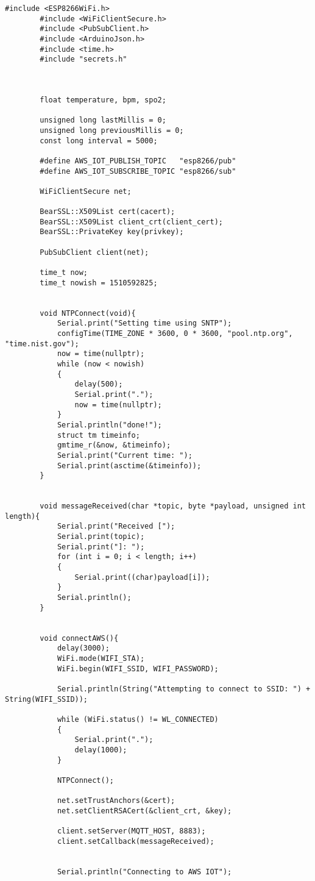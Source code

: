 \begin{flushleft}
	\begin{lstlisting}[style=CStyle]
		#include <ESP8266WiFi.h>
		#include <WiFiClientSecure.h>
		#include <PubSubClient.h>
		#include <ArduinoJson.h>
		#include <time.h>
		#include "secrets.h"
		
		
		
		float temperature, bpm, spo2;
		
		unsigned long lastMillis = 0;
		unsigned long previousMillis = 0;
		const long interval = 5000;
		
		#define AWS_IOT_PUBLISH_TOPIC   "esp8266/pub"
		#define AWS_IOT_SUBSCRIBE_TOPIC "esp8266/sub"
		
		WiFiClientSecure net;
		
		BearSSL::X509List cert(cacert);
		BearSSL::X509List client_crt(client_cert);
		BearSSL::PrivateKey key(privkey);
		
		PubSubClient client(net);
		
		time_t now;
		time_t nowish = 1510592825;
		
		
		void NTPConnect(void){
			Serial.print("Setting time using SNTP");
			configTime(TIME_ZONE * 3600, 0 * 3600, "pool.ntp.org", "time.nist.gov");
			now = time(nullptr);
			while (now < nowish)
			{
				delay(500);
				Serial.print(".");
				now = time(nullptr);
			}
			Serial.println("done!");
			struct tm timeinfo;
			gmtime_r(&now, &timeinfo);
			Serial.print("Current time: ");
			Serial.print(asctime(&timeinfo));
		}
		
		
		void messageReceived(char *topic, byte *payload, unsigned int length){
			Serial.print("Received [");
			Serial.print(topic);
			Serial.print("]: ");
			for (int i = 0; i < length; i++)
			{
				Serial.print((char)payload[i]);
			}
			Serial.println();
		}
		
		
		void connectAWS(){
			delay(3000);
			WiFi.mode(WIFI_STA);
			WiFi.begin(WIFI_SSID, WIFI_PASSWORD);
			
			Serial.println(String("Attempting to connect to SSID: ") + String(WIFI_SSID));
			
			while (WiFi.status() != WL_CONNECTED)
			{
				Serial.print(".");
				delay(1000);
			}
			
			NTPConnect();
			
			net.setTrustAnchors(&cert);
			net.setClientRSACert(&client_crt, &key);
			
			client.setServer(MQTT_HOST, 8883);
			client.setCallback(messageReceived);
			
			
			Serial.println("Connecting to AWS IOT");
			

\end{lstlisting}
\end{flushleft}
